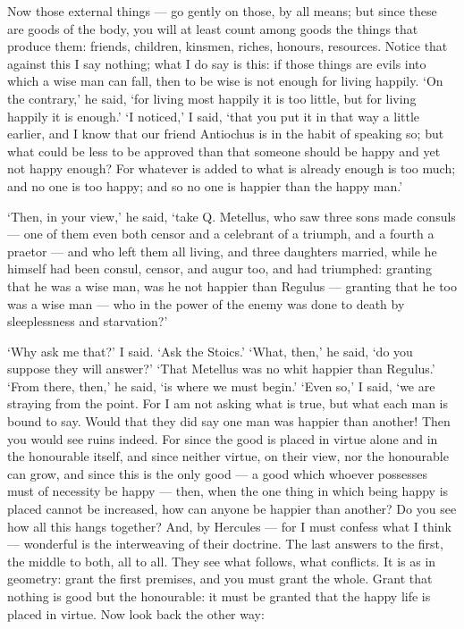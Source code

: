  Now those external things — go gently on those, by all means; but since these are goods of the body, you will at least count among goods the things that produce them: friends, children, kinsmen, riches, honours, resources. Notice that against this I say nothing; what I do say is this: if those things are evils into which a wise man can fall, then to be wise is not enough for living happily. ‘On the contrary,’ he said, ‘for living most happily it is too little, but for living happily it is enough.’ ‘I noticed,’ I said, ‘that you put it in that way a little earlier, and I know that our friend Antiochus is in the habit of speaking so; but what could be less to be approved than that someone should be happy and yet not happy enough? For whatever is added to what is already enough is too much; and no one is too happy; and so no one is happier than the happy man.’

 ‘Then, in your view,’ he said, ‘take Q. Metellus, who saw three sons made consuls — one of them even both censor and a celebrant of a triumph, and a fourth a praetor — and who left them all living, and three daughters married, while he himself had been consul, censor, and augur too, and had triumphed: granting that he was a wise man, was he not happier than Regulus — granting that he too was a wise man — who in the power of the enemy was done to death by sleeplessness and starvation?’

 ‘Why ask me that?’ I said. ‘Ask the Stoics.’ ‘What, then,’ he said, ‘do you suppose they will answer?’ ‘That Metellus was no whit happier than Regulus.’ ‘From there, then,’ he said, ‘is where we must begin.’ ‘Even so,’ I said, ‘we are straying from the point. For I am not asking what is true, but what each man is bound to say. Would that they did say one man was happier than another! Then you would see ruins indeed. For since the good is placed in virtue alone and in the honourable itself, and since neither virtue, on their view, nor the honourable can grow, and since this is the only good — a good which whoever possesses must of necessity be happy — then, when the one thing in which being happy is placed cannot be increased, how can anyone be happier than another? Do you see how all this hangs together? And, by Hercules — for I must confess what I think — wonderful is the interweaving of their doctrine. The last answers to the first, the middle to both, all to all. They see what follows, what conflicts. It is as in geometry: grant the first premises, and you must grant the whole. Grant that nothing is good but the honourable: it must be granted that the happy life is placed in virtue. Now look back the other way:

